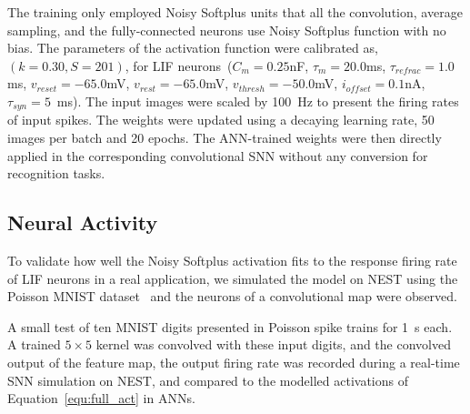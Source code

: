 \documentclass{article}
\begin{document}
The training only employed Noisy Softplus units that all the convolution, average sampling, and the fully-connected neurons use Noisy Softplus function with no bias.
The parameters of the activation function were calibrated as, $(k=0.30, S=201)$,  for LIF neurons~($C_m =0.25$nF, $\tau_m =20.0$ms, $\tau_{refrac} =1.0$ms, $v_{reset} =-65.0$mV, $v_{rest} =-65.0$mV, $v_{thresh} =-50.0$mV, $i_{offset}= 0.1$nA, $\tau_{syn}=5$~ms).
The input images were scaled by 100~Hz to present the firing rates of input spikes.
The weights were updated using a decaying learning rate, 50 images per batch and 20 epochs.
The ANN-trained weights were then directly applied in the corresponding convolutional SNN without any conversion for recognition tasks.


\subsection{Neural Activity}
To validate how well the Noisy Softplus activation fits to the response firing rate of LIF neurons in a real application, we simulated the model on NEST using the Poisson MNIST dataset~\cite{liu2016bench} and the neurons of a convolutional map were observed.

A small test of ten MNIST digits presented in Poisson spike trains for 1~s each.
A trained $5\times5$ kernel was convolved with these input digits, and the convolved output of the feature map, the output firing rate was recorded during a real-time SNN simulation on NEST, and compared to the modelled activations of Equation~\ref{equ:full_act} in ANNs.
\end{document}
